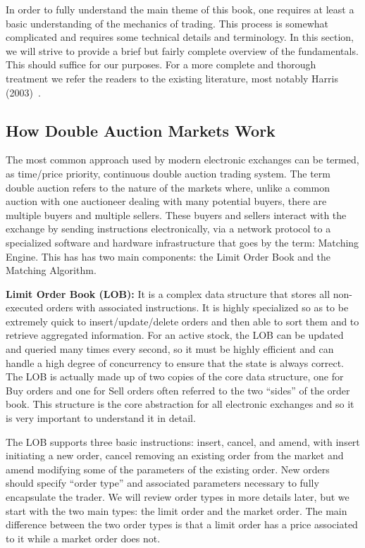 In order to fully understand the main theme of this book, one requires at least a basic understanding of the mechanics of trading. This process is somewhat complicated and requires some technical details and terminology. In this section, we will strive to provide a brief but fairly complete overview of the fundamentals. This should suffice for our purposes. For a more complete and thorough treatment we refer the readers to the existing literature, most notably Harris (2003)~\cite{harris03trade}.


\subsection{How Double Auction Markets Work}

The most common approach used by modern electronic exchanges can be termed, as time/price priority, continuous double auction trading system. The term double auction refers to the nature of the markets where, unlike a common auction with one auctioneer dealing with many potential buyers, there are multiple buyers and multiple sellers. These buyers and sellers interact with the exchange by sending instructions electronically, via a network protocol to a specialized software and hardware infrastructure that goes by the term: Matching Engine. This has has two main components: the Limit Order Book and the Matching Algorithm. \twomedskip


\noindent\textbf{Limit Order Book (LOB):} It is a complex data structure that stores all non-executed orders with associated instructions. It is highly specialized so as to be extremely quick to insert/update/delete orders and then able to sort them and to retrieve aggregated information. For an active stock, the LOB can be updated and queried many times every second, so it must be highly efficient and can handle a high degree of concurrency to ensure that the state is always correct.  The LOB is actually made up of two copies of the core data structure, one for Buy orders and one for Sell orders often referred to the two ``sides'' of the order book. This structure is the core abstraction for all electronic exchanges and so it is very important to understand it in detail. \twomedskip

The LOB supports three basic instructions: insert, cancel, and amend, with insert initiating a new order, cancel removing an existing order from the market and amend modifying some of the parameters of the existing order. New orders should specify ``order type'' and associated parameters necessary to fully encapsulate the trader. We will review order types in more details later, but we start with the two main types: the limit order and the market order. The main difference between the two order types is that a limit order has a price associated to it while a market order does not. 

